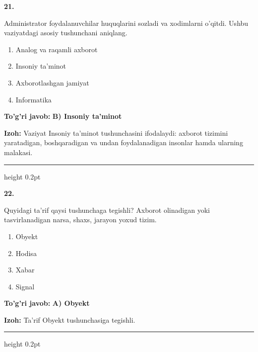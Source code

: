 \documentclass[10pt,a4paper,oneside]{article}
\begin{document}
\noindent\textbf{\color{ink}21.}
\par
Administrator foydalanuvchilar huquqlarini sozladi va xodimlarni o'qitdi. Ushbu vaziyatdagi asosiy tushunchani aniqlang.
\begin{enumerate}[label=\Alph*),leftmargin=9mm]
\item Analog va raqamli axborot
\item Insoniy ta'minot
\item Axborotlashgan jamiyat
\item Informatika
\end{enumerate}
\begin{tcolorbox}[enhanced,breakable,colback=teal!4,colframe=teal!50!black,boxrule=0.5pt,arc=1.1mm,left=3mm,right=3mm,top=1.7mm,bottom=1.7mm,before skip=2mm,after skip=2mm]
\textbf{\color{teal}To'g'ri javob:} \textbf{B) Insoniy ta'minot}
\par\smallskip
\textbf{Izoh:} Vaziyat Insoniy ta'minot tushunchasini ifodalaydi: axborot tizimini yaratadigan, boshqaradigan va undan foydalanadigan insonlar hamda ularning malakasi.
\end{tcolorbox}
\vspace{2mm}\hrule height 0.2pt \vspace{3mm}

\noindent\textbf{\color{ink}22.}
\par
Quyidagi ta'rif qaysi tushunchaga tegishli? Axborot olinadigan yoki tasvirlanadigan narsa, shaxs, jarayon yoxud tizim.
\begin{enumerate}[label=\Alph*),leftmargin=9mm]
\item Obyekt
\item Hodisa
\item Xabar
\item Signal
\end{enumerate}
\begin{tcolorbox}[enhanced,breakable,colback=teal!4,colframe=teal!50!black,boxrule=0.5pt,arc=1.1mm,left=3mm,right=3mm,top=1.7mm,bottom=1.7mm,before skip=2mm,after skip=2mm]
\textbf{\color{teal}To'g'ri javob:} \textbf{A) Obyekt}
\par\smallskip
\textbf{Izoh:} Ta'rif Obyekt tushunchasiga tegishli.
\end{tcolorbox}
\vspace{2mm}\hrule height 0.2pt \vspace{3mm}
\end{document}
